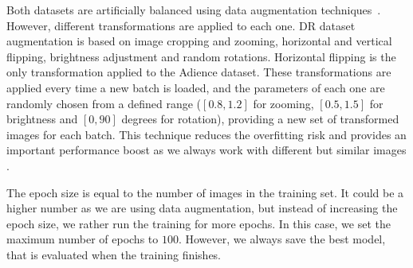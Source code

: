 \documentclass[preprint]{elsarticle}
\begin{document}
Both datasets are artificially balanced using data augmentation techniques~\cite{van2001art}. However, different transformations are applied to each one. DR dataset augmentation is based on image cropping and zooming, horizontal and vertical flipping, brightness adjustment and random rotations. Horizontal flipping is the only transformation applied to the Adience dataset. These transformations are applied every time a new batch is loaded, and the parameters of each one are randomly chosen from a defined range ($[0.8, 1.2]$ for zooming, $[0.5, 1.5]$ for brightness and $[0, 90]$ degrees for rotation), providing a new set of transformed images for each batch. This technique reduces the overfitting risk and provides an important performance boost as we always work with different but similar images \cite{krizhevsky2012imagenet}.

The epoch size is equal to the number of images in the training set. It could be a higher number as we are using data augmentation, but instead of increasing the epoch size, we rather run the training for more epochs. In this case, we set the maximum number of epochs to $100$. However, we always save the best model, that is evaluated when the training finishes.
\end{document}
